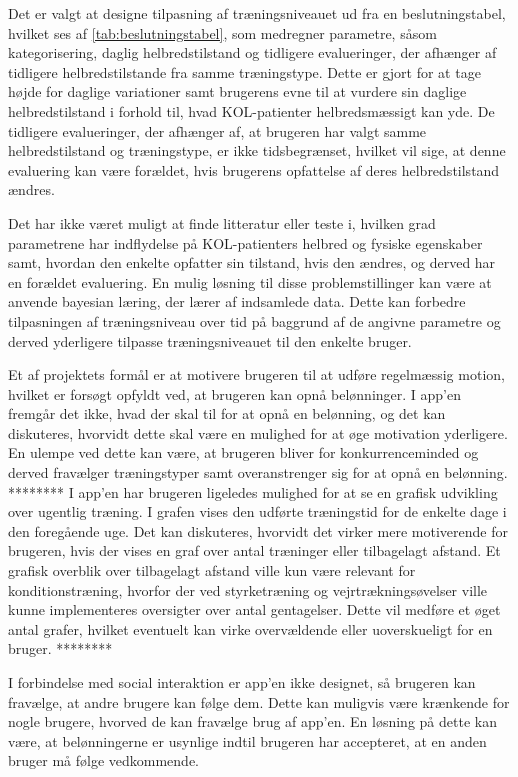 Det er valgt at designe tilpasning af træningsniveauet ud fra en beslutningstabel, hvilket ses af \autoref{tab:beslutningstabel}, som medregner parametre, såsom kategorisering, daglig helbredstilstand og tidligere evalueringer, der afhænger af tidligere helbredstilstande fra samme træningstype. Dette er gjort for at tage højde for daglige variationer samt brugerens evne til at vurdere sin daglige helbredstilstand i forhold til, hvad KOL-patienter helbredsmæssigt kan yde. De tidligere evalueringer, der afhænger af, at brugeren har valgt samme helbredstilstand og træningstype, er ikke tidsbegrænset, hvilket vil sige, at denne evaluering kan være forældet, hvis brugerens opfattelse af deres helbredstilstand ændres.

Det har ikke været muligt at finde litteratur eller teste i, hvilken grad parametrene har indflydelse på KOL-patienters helbred og fysiske egenskaber samt, hvordan den enkelte opfatter sin tilstand, hvis den ændres, og derved har en forældet evaluering. En mulig løsning til disse problemstillinger kan være at anvende bayesian læring, der lærer af indsamlede data. Dette kan forbedre tilpasningen af træningsniveau over tid på baggrund af de angivne parametre og derved yderligere tilpasse træningsniveauet til den enkelte bruger. 

Et af projektets formål er at motivere brugeren til at udføre regelmæssig motion, hvilket er forsøgt opfyldt ved, at brugeren kan opnå belønninger. I app’en fremgår det ikke, hvad der skal til for at opnå en belønning, og det kan diskuteres, hvorvidt dette skal være en mulighed for at øge motivation yderligere. En ulempe ved dette kan være, at brugeren bliver for konkurrenceminded og derved fravælger træningstyper samt overanstrenger sig for at opnå en belønning. ******** I app'en har brugeren ligeledes mulighed for at se en grafisk udvikling over ugentlig træning. I grafen vises den udførte træningstid for de enkelte dage i den foregående uge. Det kan diskuteres, hvorvidt det virker mere motiverende for brugeren, hvis der vises en graf over antal træninger eller tilbagelagt afstand. Et grafisk overblik over tilbagelagt afstand ville kun være relevant for konditionstræning, hvorfor der ved styrketræning og vejrtrækningsøvelser ville kunne implementeres oversigter over antal gentagelser. Dette vil medføre et øget antal grafer, hvilket eventuelt kan virke overvældende eller uoverskueligt for en bruger. ********

I forbindelse med social interaktion er app’en ikke designet, så brugeren kan fravælge, at andre brugere kan følge dem. Dette kan muligvis være krænkende  for nogle brugere, hvorved de kan fravælge brug af app’en. En løsning på dette kan være, at belønningerne er usynlige indtil brugeren har accepteret, at en anden bruger må følge vedkommende.

